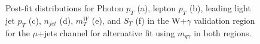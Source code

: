 \begin{figure}[]
\hfil  
{}
\caption{Post-fit distributions for Photon $p_T$ (a), lepton $p_T$ (b), leading light jet $p_T$ (c), $n_{jet}$ (d), $m_T^W$ (e), and $S_T$ (f) in the W+$\gamma$ validation region for the $\mu$+jets channel for alternative fit using  $m_{q\gamma}$ in both regions.}
\end{figure}


